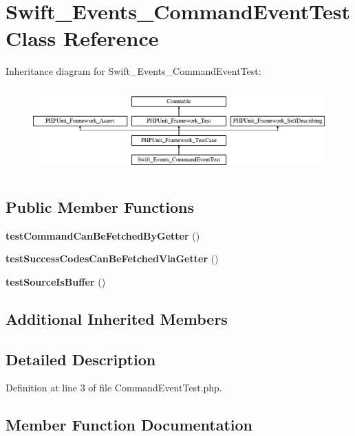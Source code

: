 \section{Swift\+\_\+\+Events\+\_\+\+Command\+Event\+Test Class Reference}
\label{class_swift___events___command_event_test}
Inheritance diagram for Swift\+\_\+\+Events\+\_\+\+Command\+Event\+Test\+:\begin{figure}[H]
\begin{center}
\leavevmode
\includegraphics[height=3.303835cm]{class_swift___events___command_event_test}
\end{center}
\end{figure}
\subsection*{Public Member Functions}
\begin{DoxyCompactItemize}
\item 
{\bf test\+Command\+Can\+Be\+Fetched\+By\+Getter} ()
\item 
{\bf test\+Success\+Codes\+Can\+Be\+Fetched\+Via\+Getter} ()
\item 
{\bf test\+Source\+Is\+Buffer} ()
\end{DoxyCompactItemize}
\subsection*{Additional Inherited Members}


\subsection{Detailed Description}


Definition at line 3 of file Command\+Event\+Test.\+php.



\subsection{Member Function Documentation}
